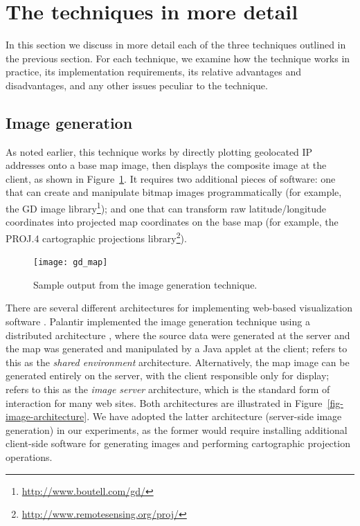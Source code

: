 \documentclass[acmtocl,acmnow]{acmtrans2m}
\begin{document}
\section{The techniques in more detail}
\label{sec-techniques}

In this section we discuss in more detail each of the three techniques
outlined in the previous section. For each technique, we examine how the
technique works in practice, its implementation requirements, its
relative advantages and disadvantages, and any other issues peculiar
to the technique.


\subsection{Image generation}
\label{sec-imagegen}

As noted earlier, this technique works by directly plotting geolocated
IP addresses onto a base map image, then displays the composite image at
the client, as shown in Figure~\ref{fig-image}. It requires two
additional pieces of software: one that can create and manipulate bitmap
images programmatically (for example, the GD image
library\footnote{\url{http://www.boutell.com/gd/}}); and one that can
transform raw latitude/longitude coordinates into projected map
coordinates on the base map (for example, the PROJ.4 cartographic
projections library\footnote{\url{http://www.remotesensing.org/proj/}}).


\begin{figure}
	\begin{center}
		\texttt{[image: gd\_map]}
	\end{center}
	\caption{Sample output from the image generation technique.}
	\label{fig-image}
\end{figure}

There are several different architectures for implementing web-based
visualization software \cite{Wood-J-1996-vis,MacE-AM-1998-GIS}. Palantir
implemented the image generation technique using a distributed
architecture \cite{Papa-N-1998-Palantir}, where the source data were
generated at the server and the map was generated and manipulated by a
Java applet at the client;  refers to this as
the \emph{shared environment} architecture. Alternatively, the map image
can be generated entirely on the server, with the client responsible
only for display;  refers to this as the
\emph{image server} architecture, which is the standard form of
interaction for many web sites. Both architectures are illustrated in
Figure~\ref{fig-image-architecture}. We have adopted the latter
architecture (server-side image generation) in our experiments, as the
former would require installing additional client-side software for
generating images and performing cartographic projection operations.
\end{document}
